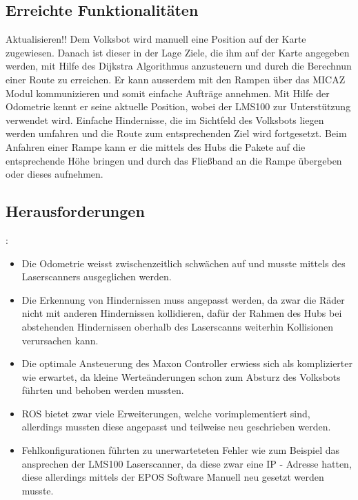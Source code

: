 \subsection{Erreichte Funktionalitäten}

Aktualisieren!!
Dem Volksbot wird manuell eine Position auf der Karte zugewiesen. Danach ist dieser in der Lage Ziele, die ihm auf der Karte angegeben werden, mit Hilfe des Dijkstra Algorithmus anzusteuern und durch die Berechnun einer Route zu erreichen. Er kann ausserdem mit den Rampen über das MICAZ Modul kommunizieren und somit einfache Aufträge annehmen. Mit Hilfe der Odometrie kennt er seine aktuelle Position, wobei der LMS100 zur Unterstützung verwendet wird. Einfache Hindernisse, die im Sichtfeld des Volksbots liegen werden umfahren und die Route zum entsprechenden Ziel wird fortgesetzt. Beim Anfahren einer Rampe kann er die mittels des Hubs die Pakete auf die entsprechende Höhe bringen und durch das Fließband an die Rampe übergeben oder dieses aufnehmen.

\subsection{Herausforderungen}:

\begin{itemize}

\item Die Odometrie weisst zwischenzeitlich schwächen auf und musste mittels des Laserscanners ausgeglichen werden.

\item Die Erkennung von Hindernissen muss angepasst werden, da zwar die Räder nicht mit anderen Hindernissen kollidieren, dafür der Rahmen des Hubs bei abstehenden Hindernissen oberhalb des Laserscanns weiterhin Kollisionen verursachen kann.

\item Die optimale Ansteuerung des Maxon Controller erwiess sich als komplizierter wie erwartet, da kleine Werteänderungen schon zum Absturz des Volksbots führten und behoben werden mussten.

\item ROS bietet zwar viele Erweiterungen, welche vorimplementiert sind, allerdings mussten diese angepasst und teilweise neu geschrieben werden.

\item Fehlkonfigurationen führten zu unerwarteteten Fehler wie zum Beispiel das ansprechen der LMS100 Laserscanner, da diese zwar eine IP - Adresse hatten, diese allerdings mittels der EPOS Software Manuell neu gesetzt werden musste.




\end{itemize}


